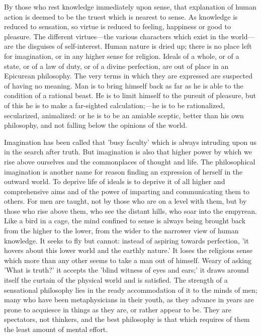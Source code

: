 \documentclass[11pt,letter]{article}
\begin{document}
\par  By those who rest knowledge immediately upon sense, that explanation of human action is deemed to be the truest which is nearest to sense. As knowledge is reduced to sensation, so virtue is reduced to feeling, happiness or good to pleasure. The different virtues—the various characters which exist in the world—are the disguises of self-interest. Human nature is dried up; there is no place left for imagination, or in any higher sense for religion. Ideals of a whole, or of a state, or of a law of duty, or of a divine perfection, are out of place in an Epicurean philosophy. The very terms in which they are expressed are suspected of having no meaning. Man is to bring himself back as far as he is able to the condition of a rational beast. He is to limit himself to the pursuit of pleasure, but of this he is to make a far-sighted calculation;—he is to be rationalized, secularized, animalized: or he is to be an amiable sceptic, better than his own philosophy, and not falling below the opinions of the world.

\par  Imagination has been called that 'busy faculty' which is always intruding upon us in the search after truth. But imagination is also that higher power by which we rise above ourselves and the commonplaces of thought and life. The philosophical imagination is another name for reason finding an expression of herself in the outward world. To deprive life of ideals is to deprive it of all higher and comprehensive aims and of the power of imparting and communicating them to others. For men are taught, not by those who are on a level with them, but by those who rise above them, who see the distant hills, who soar into the empyrean. Like a bird in a cage, the mind confined to sense is always being brought back from the higher to the lower, from the wider to the narrower view of human knowledge. It seeks to fly but cannot: instead of aspiring towards perfection, 'it hovers about this lower world and the earthly nature.' It loses the religious sense which more than any other seems to take a man out of himself. Weary of asking 'What is truth?' it accepts the 'blind witness of eyes and ears;' it draws around itself the curtain of the physical world and is satisfied. The strength of a sensational philosophy lies in the ready accommodation of it to the minds of men; many who have been metaphysicians in their youth, as they advance in years are prone to acquiesce in things as they are, or rather appear to be. They are spectators, not thinkers, and the best philosophy is that which requires of them the least amount of mental effort.
\end{document}
